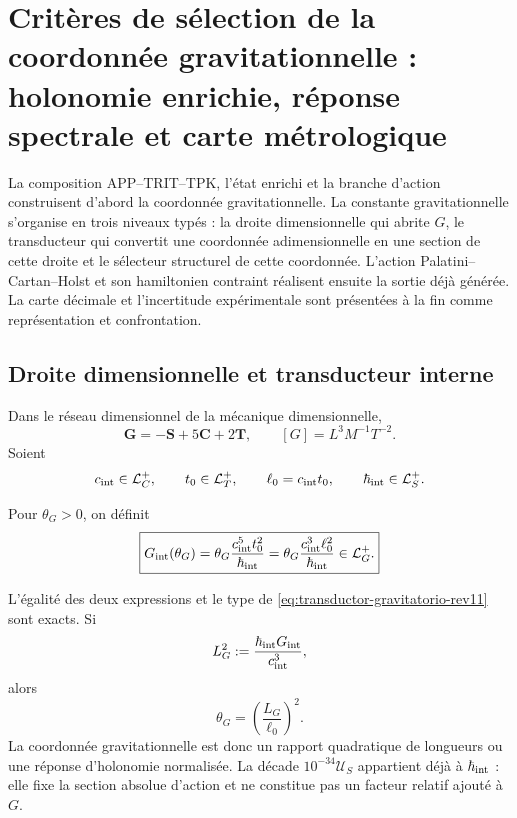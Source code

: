 \section[Critères structurels et carte métrologique de \(G\)]{Critères de
sélection de la coordonnée gravitationnelle : holonomie enrichie, réponse
spectrale et carte métrologique}
\label{sec:selector-gravitatorio-rev11}

La composition APP--TRIT--TPK, l'état enrichi et la branche d'action
construisent d'abord la coordonnée gravitationnelle. La constante gravitationnelle
s'organise en trois niveaux typés : la droite dimensionnelle qui abrite \(G\), le
transducteur qui convertit une coordonnée adimensionnelle en une section de cette
droite et le sélecteur structurel de cette coordonnée. L'action
Palatini--Cartan--Holst et son hamiltonien contraint réalisent ensuite la
sortie déjà générée. La carte décimale et l'incertitude expérimentale sont
présentées à la fin comme représentation et confrontation.

\subsection{Droite dimensionnelle et transducteur interne}

Dans le réseau dimensionnel de la mécanique dimensionnelle,
\[
 \mathbf G=-\mathbf S+5\mathbf C+2\mathbf T,
 \qquad [G]=L^3M^{-1}T^{-2}.
\]
Soient
\[
 c_{\rm int}\in\mathcal L_C^+,
 \qquad t_0\in\mathcal L_T^+,
 \qquad \ell_0=c_{\rm int}t_0,
 \qquad \hbar_{\rm int}\in\mathcal L_S^+.
\]

\begin{definition}
\label{def:transductor-gravitatorio-rev11}
Pour \(\theta_G>0\), on définit
\begin{equation}
 \boxed{
 G_{\rm int}(\theta_G)
 =\theta_G\frac{c_{\rm int}^{5}t_0^2}{\hbar_{\rm int}}
 =\theta_G\frac{c_{\rm int}^{3}\ell_0^2}{\hbar_{\rm int}}
 \in\mathcal L_G^+.}
 \label{eq:transductor-gravitatorio-rev11}
\end{equation}
\end{definition}

L'égalité des deux expressions et le type de
\eqref{eq:transductor-gravitatorio-rev11} sont exacts. Si
\[
 L_G^2:=\frac{\hbar_{\rm int}G_{\rm int}}{c_{\rm int}^3},
\]
alors
\begin{equation}
 \theta_G=\left(\frac{L_G}{\ell_0}\right)^2.
 \label{eq:thetaG-razon-longitudes-rev11}
\end{equation}
La coordonnée gravitationnelle est donc un rapport quadratique de longueurs
ou une réponse d'holonomie normalisée. La décade
\(10^{-34}\mathcal U_S\) appartient déjà à \(\hbar_{\rm int}\) : elle fixe la section
absolue d'action et ne constitue pas un facteur relatif ajouté à \(G\).

